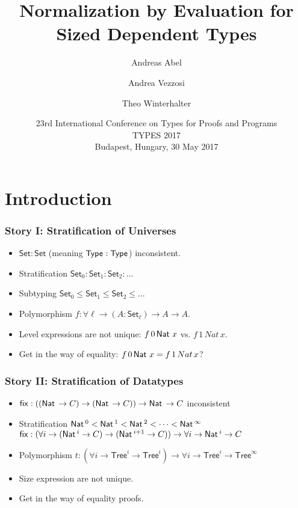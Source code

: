 \documentclass[t]{beamer}
\title[NbE for Sized Dependent Types]{%
  Normalization by Evaluation for Sized Dependent Types}
\author[Abel Vezzosi Winterhalter]{
  Andreas Abel\inst{1}
  \and Andrea Vezzosi\inst{1}
  \and Theo Winterhalter\inst{2}
}
\institute[] %
{
  \inst{1}
  Department of Computer Science and Engineering\\
  Chalmers and Gothenburg University, Sweden \\[1ex]

  \inst{2}
  École Normale Supérieure de Cachan, France \\
}
\date[TYPES'17] %
{ 23rd International Conference on
  Types for Proofs and Programs \\
  TYPES 2017 \\
  Budapest, Hungary, 30 May 2017
}
\renewcommand{\Set}{\mathsf{Set}}
\newcommand{\Tree}{\mathsf{Tree}}
\begin{document}
\maketitle



%

\section{Introduction}


\begin{frame}%
  \frametitle{Story I: Stratification of Universes}
  \begin{itemize}
  \item $\Set : \Set$ (meaning $\mathsf{Type}_{} : \mathsf{Type}_{}$) inconsistent.
  \item Stratification $\Set_0 : \Set_1 : \Set_2 : \dots$
  \item Subtyping $\Set_0 \leq \Set_1 \leq \Set_2 \leq \dots$
  \item Polymorphism $f : \forall \ell \to (A : \Set_\ell) \to A \to A$.
  \item Level expressions are not unique: $f\,0\,\mathsf{Nat}\,\,x$ vs. $f\,1\,Nat\,x$.
  \item Get in the way of equality: $f\,0\,\mathsf{Nat}\,\,x = f\,1\,Nat\,x$?
  \end{itemize}
\end{frame}

\begin{frame}%
  \frametitle{Story II: Stratification of Datatypes}
  \begin{itemize}
  \item $\mathsf{fix} : ((\mathsf{Nat}\, \to C) \to (\mathsf{Nat}\, \to C)) \to \mathsf{Nat}\, \to C$
    inconsistent
  \item Stratification $\mathsf{Nat}\,^0 < \mathsf{Nat}\,^1 < \mathsf{Nat}\,^2 < \dots < \mathsf{Nat}\,^\infty$ \\
    $\mathsf{fix} : (\forall i \to (\mathsf{Nat}\,^i \to C) \to (\mathsf{Nat}\,^{i+1} \to C))
    \to \forall i \to \mathsf{Nat}\,^i \to C$
  \item Polymorphism $t : (\forall i \to \Tree^i \to \Tree^i) \to
    \forall i \to \Tree^i \to \Tree^\infty$
  \item Size expression are not unique.
  \item Get in the way of equality proofs.
  \end{itemize}
\end{frame}
\end{document}
